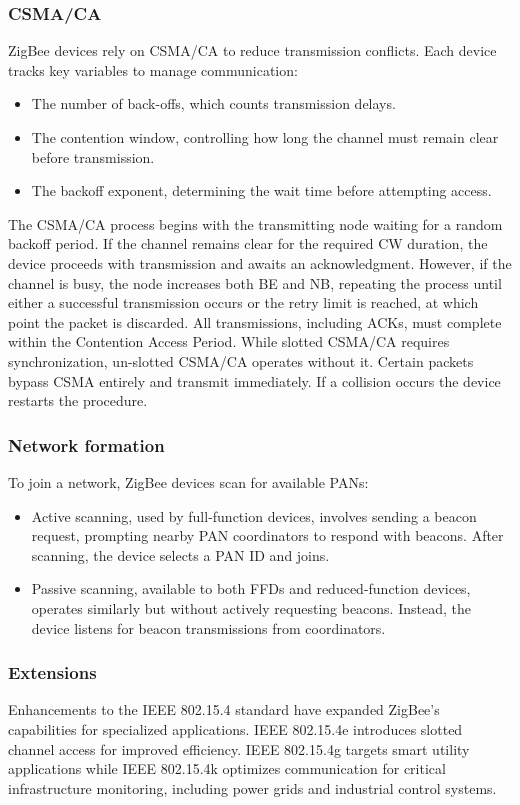 \subsubsection{CSMA/CA}
ZigBee devices rely on CSMA/CA to reduce transmission conflicts. 
Each device tracks key variables to manage communication: 
\begin{itemize}
    \item The number of back-offs, which counts transmission delays.
    \item The contention window, controlling how long the channel must remain clear before transmission.
    \item The backoff exponent, determining the wait time before attempting access.
\end{itemize}
\noindent The CSMA/CA process begins with the transmitting node waiting for a random backoff period. 
If the channel remains clear for the required CW duration, the device proceeds with transmission and awaits an acknowledgment. 
However, if the channel is busy, the node increases both BE and NB, repeating the process until either a successful transmission occurs or the retry limit is reached, at which point the packet is discarded.
All transmissions, including ACKs, must complete within the Contention Access Period. 
While slotted CSMA/CA requires synchronization, un-slotted CSMA/CA operates without it. 
Certain packets bypass CSMA entirely and transmit immediately. 
If a collision occurs the device restarts the procedure.

\subsubsection{Network formation}
To join a network, ZigBee devices scan for available PANs: 
\begin{itemize}
    \item Active scanning, used by full-function devices, involves sending a beacon request, prompting nearby PAN coordinators to respond with beacons. 
        After scanning, the device selects a PAN ID and joins. 
    \item Passive scanning, available to both FFDs and reduced-function devices, operates similarly but without actively requesting beacons.
        Instead, the device listens for beacon transmissions from coordinators.
\end{itemize}

\subsubsection{Extensions}
Enhancements to the IEEE 802.15.4 standard have expanded ZigBee's capabilities for specialized applications.
IEEE 802.15.4e introduces slotted channel access for improved efficiency. 
IEEE 802.15.4g targets smart utility applications while IEEE 802.15.4k optimizes communication for critical infrastructure monitoring, including power grids and industrial control systems.

